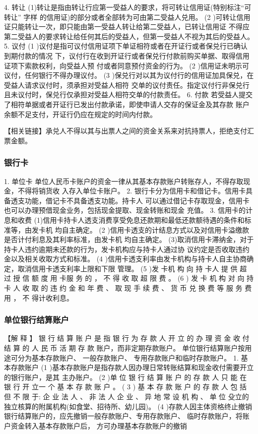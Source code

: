 \documentclass[UTF8,12pt]{ctexart}
\numberwithin{equation}{section} %
\numberwithin{figure}{section}
\numberwithin{table}{section}
\begin{document}
	
	4. 转让
	(1)转让是指由转让行应第一受益人的要求，将可转让信用证(特别标注“可转让” 字样
	的信用证)的部分或者全部转为可由第二受益人兑用。
	(2 )可转让信用证只能转让一次，即只能由第一受益人转让给第二受益人，已转让信用证
	不得应第二受益人的要求转让给任何其后的受益人，但第一受益人不视为其后的受益人。
	5. 议付
	(1 )议付是指可议付信用证项下单证相符或者在开证行或者保兑行已确认到期付款的情况
	下，议付行在收到开证行或者保兑行付款前购买单据、取得信用证项下索款权利，向受益人预
	付或者同意预付资金的行为。
	(2 )信用证未明示可议付，任何银行不得办理议付。
	(3 )保兑行对以其为议付行的信用证加具保兑，在受益人请求议付时，须承担对受益人相符
	交单的议付责任。指定议付行非保兑行且未议付时，保兑行仅承担对受益人相符交单的付款责任。
	6. 付款
	若受益人提交了相符单据或者开证行已发出付款承诺，即使申请人交存的保证金及其存款
	账户余额不足支付，开证行仍应在规定的时间内付款。
	
	
	
	【相关链接】承兑人不得以其与出票人之间的资金关系来对抗持票人，拒绝支付汇票金额。
	
	\subsubsection{银行卡} 
	1. 单位卡
	单位人民币卡账户的资金一律从其基本存款账户转账存人，不得存取现金，不得将销货收
	入存入单位卡账户。
	2. 银行卡分为信用卡和借记卡。信用卡具备透支功能，借记卡不具备透支功能。持卡人
	可以通过借记卡存取现金，信用卡也可以办理预借现金业务，包括现金提取、现金转账和现金
	充值。
	3. 信用卡的计息和收费
	(1)信用卡持卡人透支消费享受免息还款期和最低还款额待遇的条件和标准等，由发卡机
	均自主确定。
	(2 )信用卡透支的计结息方式以及对信用卡溢缴款是否计付利息及其利率标准，由发卡机
	均自主确定。
	(3)取消信用卡滞纳金，对于持卡人违约逾期未还款的行为，发卡机构应与持卡人通过协
	议约定是否收取违约金以及相关收取方式和标准。
	(4 )信用卡透支利率由发卡机构与持卡人自主协商确定，取消信用卡透支利率上限和下限
	管理。
	(5 )发 卡机 构 向 持 卡人 提 供 超 过 授 信 额 度 用 卡服 务 的 ， 不 得 收 取 超 限 费 。
	(6 ) 发 卡 机 构 对 向 持 卡 人 收 取 的 违 约 金 和 年 费 、 取 现 手 续 费 、 货 币 兑 换 费 等 服 务 费 用 ， 不
	得计收利息。
	
	\subsubsection{单位银行结算账户} 
	【解 释 】 银 行 结 算 账 户 是 指 银 行 为 存 款 人 开 立 的 办 理 资 金 收 付 结 算 的 人 民 币 活 期 存 款
	账户，而非定期存款账户。 单位银行结算账户按用途可分为基本存款账户、 一般存款账户、
	专用存款账户和临时存款账户。
	1. 基本存款账户
	(1 )基本存款账户是指存款人因办理日常转账结算和现金收付需要开立的银行账户，是其
	主办账户。
	(2 )单 位 银 行 结 算 账 户 的 存 款 人 只 能 在 银 行 开 立一 个 基 本 存 款 账 户 。
	( 3 ) 基 本 存 款 账 户 的 存 款 人 包 括 但 不 限 于: 企 业 法 人 、 非 法 人 企 业 、 异 地 常 设 机 构 、 单 位
	殳立的独立核算的附属机构(如食堂、招待所、幼儿园)。
	(4 )存款人因主体资格终止撤销银行结算账户的，应先撤销一般存款账户、专用存款账户、
	临时存款账户，将账户资金转入基本存款账户后， 方可办理基本存款账户的撤销
	
\end{document}
